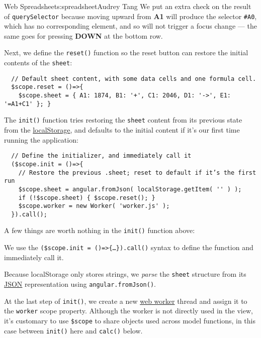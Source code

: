 \begin{aosachapter}{Web Spreadsheet}{s:spreadsheet}{Audrey Tang}
We put an extra check on the result of \texttt{querySelector} because
moving upward from \textbf{A1} will produce the selector \texttt{\#A0},
which has no corresponding element, and so will not trigger a focus
change --- the same goes for pressing \textbf{DOWN} at the bottom row.

Next, we define the \texttt{reset()} function so the reset button can
restore the initial contents of the \texttt{sheet}:

\begin{verbatim}
  // Default sheet content, with some data cells and one formula cell.
  $scope.reset = ()=>{ 
    $scope.sheet = { A1: 1874, B1: '+', C1: 2046, D1: '->', E1: '=A1+C1' }; }
\end{verbatim}

The \texttt{init()} function tries restoring the \texttt{sheet} content
from its previous state from the
\href{https://developer.mozilla.org/en-US/docs/Web/Guide/API/DOM/Storage\#localStorage}{localStorage},
and defaults to the initial content if it's our first time running the
application:

\begin{verbatim}
  // Define the initializer, and immediately call it
  ($scope.init = ()=>{
    // Restore the previous .sheet; reset to default if it’s the first run
    $scope.sheet = angular.fromJson( localStorage.getItem( '' ) );
    if (!$scope.sheet) { $scope.reset(); }
    $scope.worker = new Worker( 'worker.js' );
  }).call();
\end{verbatim}

A few things are worth nothing in the \texttt{init()} function above:

\begin{aosaitemize}

\item
  We use the
  \texttt{(\$scope.init = ()=\textgreater{}\{\ldots{}\}).call()} syntax
  to define the function and immediately call it.
\item
  Because localStorage only stores strings, we \emph{parse} the
  \texttt{sheet} structure from its
  \href{https://developer.mozilla.org/en-US/docs/Glossary/JSON}{JSON}
  representation using \texttt{angular.fromJson()}.
\item
  At the last step of \texttt{init()}, we create a new
  \href{https://developer.mozilla.org/en-US/docs/Web/API/Worker}{web
  worker} thread and assign it to the \texttt{worker} scope property.
  Although the worker is not directly used in the view, it's customary
  to use \texttt{\$scope} to share objects used across model functions,
  in this case between \texttt{init()} here and \texttt{calc()} below.
\end{aosaitemize}


\end{aosachapter}
